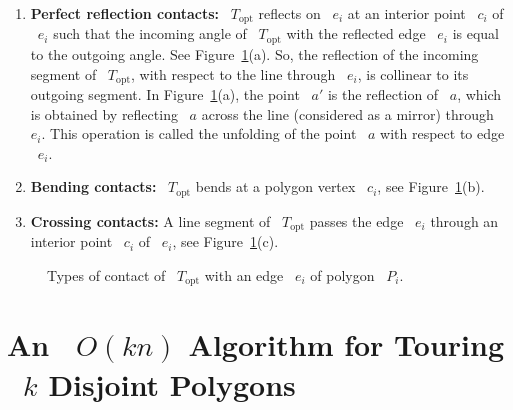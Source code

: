 \documentclass[11pt]{article}
\begin{document}
\begin{enumerate}
	\item \textbf{Perfect reflection contacts:} ~\(T_{\mathrm{opt}}\) reflects on ~\(e_i\) at an interior point ~\(c_i\) of ~\(e_i\) such that the incoming angle of ~\(T_{\mathrm{opt}}\) with the reflected edge ~\(e_i\) is equal to the outgoing angle. See Figure~\ref{fig:contacttypes}(a). So, the reflection of the incoming segment of ~\(T_{\mathrm{opt}}\), with respect to the line through ~\(e_i\), is collinear to its outgoing segment. In Figure~\ref{fig:contacttypes}(a), the point ~\(a'\) is the reflection of ~\(a\), which is obtained by reflecting ~\(a\) across the line (considered as a mirror) through ~\(e_i\). This operation is called the unfolding of the point ~\(a\) with respect to edge ~\(e_i\).
	\item \textbf{Bending contacts:} ~\(T_{\mathrm{opt}}\) bends at a polygon vertex ~\(c_i\), see Figure~\ref{fig:contacttypes}(b).
	\item \textbf{Crossing contacts:} A line segment of ~\(T_{\mathrm{opt}}\) passes the edge ~\(e_i\) through an interior point ~\(c_i\) of ~\(e_i\), see Figure~\ref{fig:contacttypes}(c).
\end{enumerate}

\begin{figure}[H]
	\centering
	\caption{Types of contact of ~\(T_{\mathrm{opt}}\) with an edge ~\(e_i\) of polygon ~\(P_i\).}
	\label{fig:contacttypes}
\end{figure}

\section{An ~\(O(kn)\) Algorithm for Touring ~\(k\) Disjoint Polygons}
\label{sec:disjoint}
\end{document}
